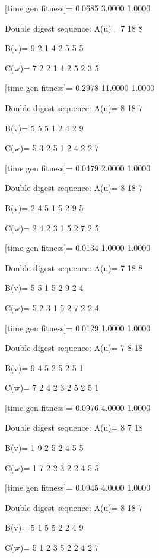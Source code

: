 [time gen fitness]=
    0.0685    3.0000    1.0000

Double digest sequence:
A(u)=
     7    18     8

B(v)=
     9     2     1     4     2     5     5     5

C(w)=
     7     2     2     1     4     2     5     2     3     5

[time gen fitness]=
    0.2978   11.0000    1.0000

Double digest sequence:
A(u)=
     8    18     7

B(v)=
     5     5     5     1     2     4     2     9

C(w)=
     5     3     2     5     1     2     4     2     2     7

[time gen fitness]=
    0.0479    2.0000    1.0000

Double digest sequence:
A(u)=
     8    18     7

B(v)=
     2     4     5     1     5     2     9     5

C(w)=
     2     4     2     3     1     5     2     7     2     5

[time gen fitness]=
    0.0134    1.0000    1.0000

Double digest sequence:
A(u)=
     7    18     8

B(v)=
     5     5     1     5     2     9     2     4

C(w)=
     5     2     3     1     5     2     7     2     2     4

[time gen fitness]=
    0.0129    1.0000    1.0000

Double digest sequence:
A(u)=
     7     8    18

B(v)=
     9     4     5     2     5     2     5     1

C(w)=
     7     2     4     2     3     2     5     2     5     1

[time gen fitness]=
    0.0976    4.0000    1.0000

Double digest sequence:
A(u)=
     8     7    18

B(v)=
     1     9     2     5     2     4     5     5

C(w)=
     1     7     2     2     3     2     2     4     5     5

[time gen fitness]=
    0.0945    4.0000    1.0000

Double digest sequence:
A(u)=
     8    18     7

B(v)=
     5     1     5     5     2     2     4     9

C(w)=
     5     1     2     3     5     2     2     4     2     7

